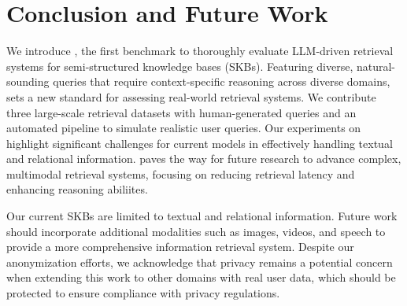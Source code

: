 \vspace{-3pt}
\section{Conclusion and Future Work}
\label{sec:conclusion}
\vspace{-5pt}
We introduce \benchmarkt, the first benchmark to thoroughly evaluate LLM-driven retrieval systems for semi-structured knowledge bases (SKBs). Featuring diverse, natural-sounding queries that require context-specific reasoning across diverse domains, \benchmarkh sets a new standard for assessing real-world retrieval systems. We contribute three large-scale retrieval datasets with human-generated queries and an automated pipeline to simulate realistic user queries. Our experiments on \benchmarkh highlight significant challenges for current models in effectively handling textual and relational information. \benchmarkh paves the way for future research to advance complex, multimodal retrieval systems, focusing on reducing retrieval latency and enhancing reasoning abiliites.

Our current SKBs are limited to textual and relational information. Future work should incorporate additional modalities such as images, videos, and speech to provide a more comprehensive information retrieval system. Despite our anonymization efforts, we acknowledge that privacy remains a potential concern when extending this work to other domains with real user data, which should be protected to ensure compliance with privacy regulations.

\newpage